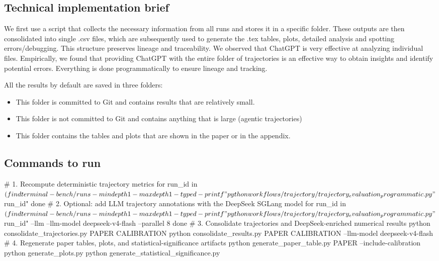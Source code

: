 \documentclass[11pt]{article}
\begin{document}
\subsection*{Technical implementation brief}
We first use a script that collects the necessary information from all runs and stores it in a specific folder.
These outputs are then consolidated into single .csv files, which are subsequently used to generate the .tex tables, plots, detailed analysis and spotting errors/debugging.
This structure preserves lineage and traceability.
We observed that ChatGPT is very effective at analyzing individual files. 
Empirically, we found that providing ChatGPT with the entire folder of trajectories is an effective way to obtain insights and identify potential errors.
Everything is done programmatically to ensure lineage and tracking. 


All the results by default are saved in three folders:
\begin{itemize}
  \item {} This folder is committed to Git and contains results that are relatively small.
  \item {} This folder is not committed to Git and contains anything that is large (agentic trajectories)
  \item {} This folder contains the tables and plots that are shown in the paper or in the appendix.
\end{itemize}

\label{sec:experiment-plan-commands-to-run}
\subsection*{Commands to run}
\begin{DocCode}
# 1. Recompute deterministic trajectory metrics
for run_id in $(find terminal-bench/runs -mindepth 1 -maxdepth 1 -type d -printf "%
  python workflows/trajectory/trajectory_evaluation_programmatic.py "$run_id"
done
# 2. Optional: add LLM trajectory annotations with the DeepSeek SGLang model
for run_id in $(find terminal-bench/runs -mindepth 1 -maxdepth 1 -type d -printf "%
  python workflows/trajectory/trajectory_evaluation_programmatic.py "$run_id" --llm --llm-model deepseek-v4-flash --parallel 8
done
# 3. Consolidate trajectories and DeepSeek-enriched numerical results
python consolidate_trajectories.py PAPER CALIBRATION
python consolidate_results.py PAPER CALIBRATION --llm-model deepseek-v4-flash
# 4. Regenerate paper tables, plots, and statistical-significance artifacts
python generate_paper_table.py PAPER --include-calibration
python generate_plots.py
python generate_statistical_significance.py
\end{DocCode}
\end{document}
